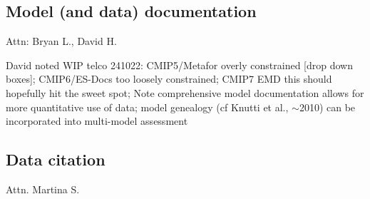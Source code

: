 \documentclass[gmd, preprint]{copernicus}
\newcommand{\mycomment}[1]{}
\def\cred#1{{\color{red}#1}}
\begin{document}
\mycomment{
The CMIP6 "data request" \citep{juckes_cmip6_2020} was the most comprehensively outlined preceded by three decades of evolution in climate model understanding. This history underpinned the development of the standard experimental protocols 
\citet{gates_amip_1991} - AMIP1
\citet{gates_amip_1993} - AMIP History Archive
\citet{gates_amip_1994} - AMIP Ensemble
\citet{gleckler_amip_1996} - AMIP 7 monthly mean and six-hourly output, plus ensembles/AMIP 2
\citet{gleckler_amip_1996-1} - AMIP number 8, STANDARD OUTPUT low and high frequency (6-hr)
https://pcmdi.llnl.gov/mips/amip/OUTPUT/WGNEDIAGS/index.html
\citet{taylor_pcmdi_2009}
\citet{taylor_pcmdi_2013}
\citet{juckes_baseline_2024}

FANGIO not multi-year (perpetual July)/January; AMIP1 success, multi-year SST/sea-ice (Russians and Chinese); AMIP2 next-level output, more high-frequency data, mean products (covariances; u/v-prime overbar - on the fly calculation) monthly mean timeseries (Boer \& Lambert 2008, clim dyn - relationship to Lorenz energy cycle)
CMIP2: https://pcmdi.llnl.gov/mips/cmip2/
CMIP3: https://pcmdi.llnl.gov/mips/cmip3/experiment.html
CMIP5: https://pcmdi.llnl.gov/mips/cmip5/requirements.html
}


\subsection{Model (and data) documentation}
\label{sec:ModelDocumentation}
\cred{Attn: Bryan L., David H.}

\cred{David noted WIP telco 241022: CMIP5/Metafor \citep{guilyardi_cmip5_2011} overly constrained [drop down boxes]; CMIP6/ES-Docs \citep{pascoe_documenting_2020} too loosely constrained; CMIP7 EMD this should hopefully hit the sweet spot; Note comprehensive model documentation allows for more quantitative use of data; model genealogy (cf Knutti et al., ${\sim}$2010) can be incorporated into multi-model assessment}


\subsection{Data citation}
\label{sec:DataCitation}
\cred{Attn. Martina S.}
\end{document}
